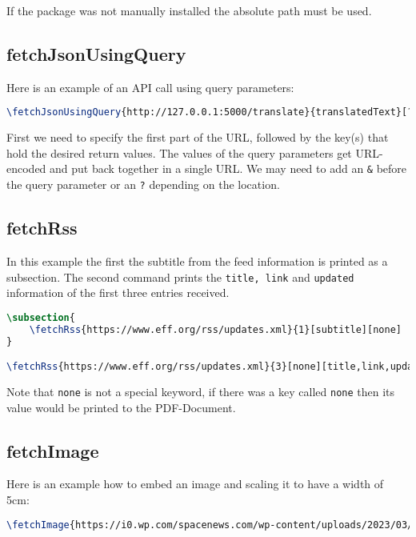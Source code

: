 \documentclass[11pt]{article}
\begin{document}
If the package was not manually installed the absolute path must be used.

\subsection{fetchJsonUsingQuery}

Here is an example of an API call using query parameters:

\begin{lstlisting}[language=tex]
\fetchJsonUsingQuery{http://127.0.0.1:5000/translate}{translatedText}[?q=I want to translate this text][&source=en][&target=de][&format=text]
\end{lstlisting}

First we need to specify the first part of the URL, followed by the key(s) that hold the desired return values. The values of the query parameters get URL-encoded and put back together in a single URL. We may need to add an \texttt{\&} before the query parameter or an \texttt{?} depending on the location.

\subsection{fetchRss}

In this example the first the subtitle from the feed information is printed as a subsection. The second command prints the \texttt{title, link} and \texttt{updated} information of the first three entries received.

\begin{lstlisting}[language=tex]
\subsection{
    \fetchRss{https://www.eff.org/rss/updates.xml}{1}[subtitle][none]
}

\fetchRss{https://www.eff.org/rss/updates.xml}{3}[none][title,link,updated]
\end{lstlisting}

Note that \texttt{none} is not a special keyword, if there was a key called \texttt{none} then its value would be printed to the PDF-Document.

\subsection{fetchImage}
Here is an example how to embed an image and scaling it to have a width of 5cm:

\begin{lstlisting}[language=tex]
\fetchImage{https://i0.wp.com/spacenews.com/wp-content/uploads/2023/03/vorb-march2023.jpg}[5cm]
\end{lstlisting}
\end{document}
